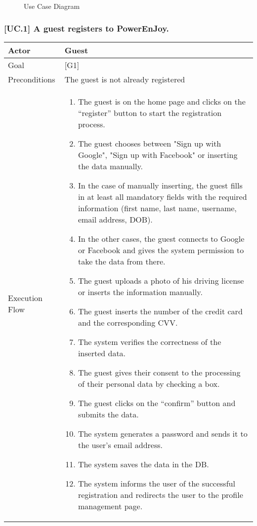 \documentclass[english]{article}
\begin{document}
	\begin{figure}
		\centering
		\makebox[\textwidth][c]{
			\def\svgwidth{500pt}

			
		}
		\caption{Use Case Diagram}
	\end{figure}
	\newpage
	\subsubsection{[UC.1] A guest registers to PowerEnJoy.}
	\begin{tabularx}{\textwidth}{  l  X  }
		\hline
		Actor & Guest\\
		\hline
		Goal & [G1]\\
		\hline
		Preconditions & The guest is not already registered\\
		\hline
		Execution Flow & \begin{enumerate}
			\item{The guest is on the home page and clicks on the “register” button to start the registration process.}
			\item{The guest chooses between "Sign up with Google", "Sign up with Facebook" or inserting the data manually.}
			\item{In the case of manually inserting, the guest fills in at least all mandatory fields with the required information (first name, last name, username, email address, DOB).}
			\item{In the other cases, the guest connects to Google or Facebook and gives the system permission to take the data from there.}
			\item{The guest uploads a photo of his driving license or inserts the information manually.}
			\item{The guest inserts the number of the credit card and the corresponding CVV}.
			\item{The system verifies the correctness of the inserted data.}
			\item{The guest gives their consent to the processing of their personal data by checking a box.}
			\item{The guest clicks on the “confirm” button and submits the data.}
			\item{The system generates a password and sends it to the user's email address.}
			\item{The system  saves the data in the DB.}
			\item{The system informs the user of the successful registration and redirects the user to the profile management page.}
		\end{enumerate}\\
		\hline
	\end{tabularx}
\end{document}
